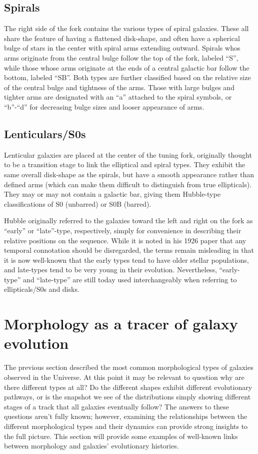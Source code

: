 \subsection{Spirals}

The right side of the fork contains the various types of spiral galaxies. These all share the feature of having a flattened disk-shape, and often have a spherical bulge of stars in the center with spiral arms extending outward. Spirals whos arms originate from the central bulge follow the top of the fork, labeled ``S'', while those whose arms originate at the ends of a central galactic bar follow the bottom, labeled ``SB''. Both types are further classified based on the relative size of the central bulge and tightness of the arms. Those with large bulges and tighter arms are designated with an ``a'' attached to the spiral symbols, or ``b''-``d'' for decreasing bulge sizes and looser appearance of arms. 

\subsection{Lenticulars/S0s}

Lenticular galaxies are placed at the center of the tuning fork, originally thought to be a transition stage to link the elliptical and spiral types. They exhibit the same overall disk-shape as the spirals, but have a smooth appearance rather than defined arms (which can make them difficult to distinguish from true ellipticals). They may or may not contain a galactic bar, giving them Hubble-type classifications of S0 (unbarred) or S0B (barred). 


Hubble originally referred to the galaxies toward the left and right on the fork as ``early'' or ``late''-type, respectively, simply for convenience in describing their relative positions on the sequence. While it is noted in his 1926 paper that any temporal connotation should be disregarded, the terms remain misleading in that it is now well-known that the early types tend to have older stellar populations, and late-types tend to be very young in their evolution. Nevertheless, ``early-type'' and ``late-type'' are still today used interchangeably when referring to ellipticals/S0s and disks. 

\section{Morphology as a tracer of galaxy evolution}

The previous section described the most common morphological types of galaxies observed in the Universe. At this point it may be relevant to question why are there different types at all? Do the different shapes exhibit different evolutionary pathways, or is the snapshot we see of the distributions simply showing different stages of a track that all galaxies eventually follow? The answers to these questions aren't fully known; however, examining the relationships between the different morphological types and their dynamics can provide strong insights to the full picture. This section will provide some examples of well-known links between morphology and galaxies' evolutionary histories.


